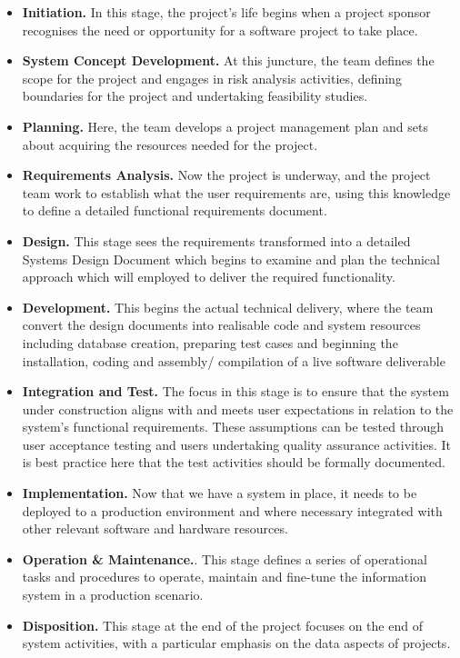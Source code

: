\documentclass[a4paper,Times New Roman 11pt]{article}
\begin{document}
\begin{samepage}
\begin{samepage}
\begin{itemize}
\item  \textbf{Initiation.} In this stage, the project's life begins when a project sponsor recognises the need or opportunity for a software project to take place.
\item  \textbf {System Concept Development.} At this juncture, the team defines the scope for the project and engages in risk analysis activities, defining boundaries for the project and undertaking feasibility studies.
\item  \textbf{Planning.} Here, the team develops a project management plan and sets about acquiring the resources needed for the project.
\item  \textbf{Requirements Analysis.} Now the project is underway, and the project team work to establish what the user requirements are, using this knowledge to define a detailed functional requirements document.
\item  \textbf{Design.} This stage sees the requirements transformed into a detailed Systems Design Document which begins to examine and plan the technical approach which will employed to deliver the required functionality.
\item  \textbf{Development.} This begins the actual technical delivery, where the team convert the design documents into realisable code and system resources including database creation, preparing test cases and beginning the installation, coding and assembly/ compilation of a live software deliverable
\item  \textbf{Integration and Test.} The focus in this stage is to ensure that the system under construction aligns with and meets user expectations in relation to the system's functional requirements. These assumptions can be tested through user acceptance testing and users undertaking quality assurance activities. It is best practice here that the test activities should be formally documented. 
\item  \textbf{Implementation.} Now that we have a system in place, it needs to be deployed to a production environment and where necessary integrated with other relevant software and hardware resources.
\item  \textbf{Operation \& Maintenance.}. This stage defines a series of operational tasks and procedures to operate, maintain and fine-tune the information system in a production scenario.
\item  \textbf{Disposition.} This stage at the end of the project focuses on the end of system activities, with a particular emphasis on the data aspects of projects.
\end{itemize}



\end{samepage}
\end{samepage}
\end{document}

